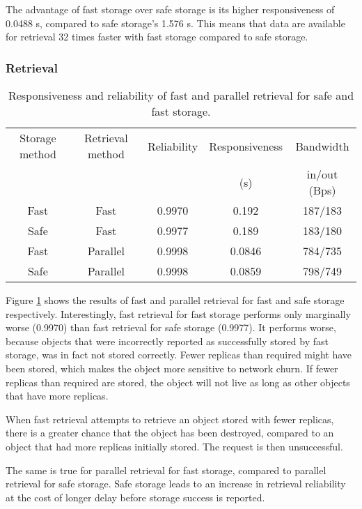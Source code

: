 The advantage of fast storage over safe storage is its higher responsiveness of 0.0488 s, compared to safe storage's 1.576 s. This means that data are available for retrieval 32 times faster with fast storage compared to safe storage.

\subsubsection{Retrieval}

\begin{table}[htbp]
\centering
\begin{tabular}{|c|c|c|c|c|}
\hline
Storage method & Retrieval method & Reliability & Responsiveness & Bandwidth \\
               &                  &             &      (s)       & in/out (Bps)\\
\hline
Fast           &   Fast           &   0.9970    &   0.192        & 187/183\\
Safe           &   Fast           &   0.9977    &   0.189        & 183/180\\
Fast           &   Parallel       &   0.9998    &   0.0846       & 784/735\\
Safe           &   Parallel       &   0.9998    &   0.0859       & 798/749\\
\hline
\end{tabular}
\caption{Responsiveness and reliability of fast and parallel retrieval for safe and fast storage.}
\label{tab_pithos_results}
\end{table}
%
Figure \ref{tab_pithos_results} shows the results of fast and parallel retrieval for fast and safe storage respectively. Interestingly, fast retrieval for fast storage performs only marginally worse (0.9970) than fast retrieval for safe storage (0.9977). It performs worse, because objects that were incorrectly reported as successfully stored by fast storage, was in fact not stored correctly. Fewer replicas than required might have been stored, which makes the object more sensitive to network churn. If fewer replicas than required are stored, the object will not live as long as other objects that have more replicas.

When fast retrieval attempts to retrieve an object stored with fewer replicas, there is a greater chance that the object has been destroyed, compared to an object that had more replicas initially stored. The request is then unsuccessful.

The same is true for parallel retrieval for fast storage, compared to parallel retrieval for safe storage. Safe storage leads to an increase in retrieval reliability at the cost of longer delay before storage success is reported.

